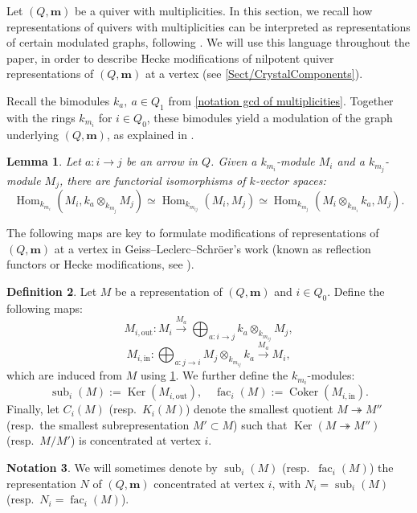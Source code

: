 \documentclass[a4paper,12pt]{article}
\theoremstyle{definition}
\newtheorem{definition}{Definition}[section]
\newtheorem{notation}[definition]{Notation}
\theoremstyle{plain}
\newtheorem{lemma}[definition]{Lemma}
\theoremstyle{remark}
\DeclareMathOperator{\Coker}{Coker}
\DeclareMathOperator{\fac}{fac}
\DeclareMathOperator{\Ker}{Ker}
\DeclareMathOperator{\Hom}{Hom}
\DeclareMathOperator{\sub}{sub}
\newcommand\bfm{\mathbf{m}}
\begin{document}
Let $(Q,\bfm)$ be a quiver with multiplicities. In this section, we recall how representations of quivers with multiplicities can be interpreted as representations of certain modulated graphs, following \cite[\S 5]{GLS17a}. We will use this language throughout the paper, in order to describe Hecke modifications of nilpotent quiver representations  of $(Q,\bfm)$ at a vertex (see \cref{Sect/CrystalComponents}).

Recall the bimodules $k_a,\ a\in Q_1$ from \cref{notation gcd of multiplicities}. Together with the rings $k_{m_i}$ for $ i\in Q_0$, these bimodules yield a modulation of the graph underlying $(Q,\bfm)$, as explained in \cite[\S 5]{GLS17a}.

\begin{lemma}\label{Lem/balancingBimodules}
\emph{\cite[Prop.\ 5.1]{GLS17a}} Let $a \colon i \rightarrow j$ be an arrow in $Q$. Given a $k_{m_i}$-module $M_i$ and a $k_{m_j}$-module $M_j$, there are functorial isomorphisms of $k$-vector spaces:
\[
\Hom_{k_{m_i}}(M_i,k_a\otimes_{k_{m_j}}M_j)
\simeq
\Hom_{k_{m_{ij}}}(M_i,M_j)
\simeq
\Hom_{k_{m_j}}(M_i\otimes_{k_{m_i}}k_a,M_j)
.
\]
\end{lemma}

The following maps are key to formulate modifications of representations of $(Q,\bfm)$ at a vertex in Geiss--Leclerc--Schr\"{o}er's work (known as reflection functors or Hecke modifications, see \cite{GLS17a,GLS18a}).

\begin{definition}\label{def/vertexKernelsCokernels}
Let $M$ be a representation of $(Q,\bfm)$ and $i\in Q_0$. Define the following maps:
\[
M_{i,\mathrm{out}} \colon M_i\overset{M_a}{\longrightarrow}\bigoplus_{a:i\rightarrow j}k_a\otimes_{k_{m_{ij}}}M_j
,
\]
\[
M_{i,\mathrm{in}} \colon \bigoplus_{a \colon j\rightarrow i}M_j\otimes_{k_{m_{ij}}}k_a\overset{M_a}{\longrightarrow} M_i
,
\]
which are induced from $M$ using \cref{Lem/balancingBimodules}.
We further define the $k_{m_i}$-modules:
\[
\sub_i(M):=\Ker(M_{i,\mathrm{out}}), \quad \fac_i(M):=\Coker(M_{i,\mathrm{in}})
.
\]
Finally, let $C_i(M)$ (resp.\ $K_i(M)$) denote the smallest quotient $M\twoheadrightarrow M''$ (resp.\ the smallest subrepresentation $M'\subset M$) such that $\Ker(M\twoheadrightarrow M'')$ (resp.\ $M/M'$) is concentrated at vertex $i$.
\end{definition}

\begin{notation}
We will sometimes denote by $\sub_i(M)$ (resp.\ $\fac_i(M)$) the representation $N$ of $(Q,\bfm)$ concentrated at vertex $i$, with $N_i=\sub_i(M)$ (resp.\ $N_i=\fac_i(M)$).
\end{notation}
\end{document}
